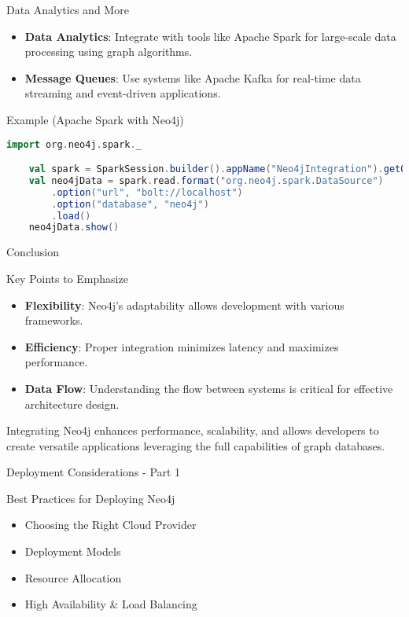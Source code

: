 \documentclass[aspectratio=169]{beamer}
\begin{document}
\begin{frame}[fragile]{Data Analytics and More}
  \begin{itemize}
    \item \textbf{Data Analytics}: Integrate with tools like Apache Spark for large-scale data processing using graph algorithms.
    \item \textbf{Message Queues}: Use systems like Apache Kafka for real-time data streaming and event-driven applications.
  \end{itemize}

  \begin{block}{Example (Apache Spark with Neo4j)}
    \begin{lstlisting}[language=Scala]
    import org.neo4j.spark._

    val spark = SparkSession.builder().appName("Neo4jIntegration").getOrCreate()
    val neo4jData = spark.read.format("org.neo4j.spark.DataSource")
        .option("url", "bolt://localhost")
        .option("database", "neo4j")
        .load()
    neo4jData.show()
    \end{lstlisting}
  \end{block}
\end{frame}

\begin{frame}{Conclusion}
  \begin{block}{Key Points to Emphasize}
    \begin{itemize}
      \item \textbf{Flexibility}: Neo4j's adaptability allows development with various frameworks.
      \item \textbf{Efficiency}: Proper integration minimizes latency and maximizes performance.
      \item \textbf{Data Flow}: Understanding the flow between systems is critical for effective architecture design.
    \end{itemize}
  \end{block}

  Integrating Neo4j enhances performance, scalability, and allows developers to create versatile applications leveraging the full capabilities of graph databases.
\end{frame}

\begin{frame}[fragile]{Deployment Considerations - Part 1}
  \begin{block}{Best Practices for Deploying Neo4j}
    \begin{itemize}
      \item Choosing the Right Cloud Provider
      \item Deployment Models
      \item Resource Allocation
      \item High Availability \& Load Balancing
    \end{itemize}
  \end{block}
\end{frame}
\end{document}
